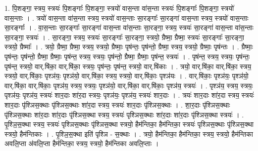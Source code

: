 \documentclass[17pt]{extarticle}
\begin{document}
1. पि॒शङ्गा॒ स्त्रय॒ स्त्रयः॑ पि॒शङ्गाः᳚ पि॒शङ्गा॒ स्त्रयो॑ वास॒न्ता वा॑स॒न्ता स्त्रयः॑ पि॒शङ्गाः᳚ पि॒शङ्गा॒ स्त्रयो॑ वास॒न्ताः । . त्रयो॑ वास॒न्ता वा॑स॒न्ता स्त्रय॒ स्त्रयो॑ वास॒न्ताः सा॒रङ्गाः᳚ सा॒रङ्गा॑ वास॒न्ता स्त्रय॒ स्त्रयो॑ वास॒न्ताः सा॒रङ्गाः᳚ । . वा॒स॒न्ताः सा॒रङ्गाः᳚ सा॒रङ्गा॑ वास॒न्ता वा॑स॒न्ताः सा॒रङ्गा॒ स्त्रय॒ स्त्रयः॑ सा॒रङ्गा॑ वास॒न्ता वा॑स॒न्ताः सा॒रङ्गा॒ स्त्रयः॑ । . सा॒रङ्गा॒ स्त्रय॒ स्त्रयः॑ सा॒रङ्गाः᳚ सा॒रङ्गा॒ स्त्रयो॒ ग्रैष्मा॒ ग्रैष्मा॒ स्त्रयः॑ सा॒रङ्गाः᳚ सा॒रङ्गा॒ स्त्रयो॒ ग्रैष्माः᳚ । . त्रयो॒ ग्रैष्मा॒ ग्रैष्मा॒ स्त्रय॒ स्त्रयो॒ ग्रैष्माः॒ पृष॑न्तः॒ पृष॑न्तो॒ ग्रैष्मा॒ स्त्रय॒ स्त्रयो॒ ग्रैष्माः॒ पृष॑न्तः । . ग्रैष्माः॒ पृष॑न्तः॒ पृष॑न्तो॒ ग्रैष्मा॒ ग्रैष्माः॒ पृष॑न्त॒ स्त्रय॒ स्त्रयः॒ पृष॑न्तो॒ ग्रैष्मा॒ ग्रैष्माः॒ पृष॑न्त॒ स्त्रयः॑ । . पृष॑न्त॒ स्त्रय॒ स्त्रयः॒ पृष॑न्तः॒ पृष॑न्त॒ स्त्रयो॒ वार्.षि॑का॒ वार्.षि॑का॒ स्त्रयः॒ पृष॑न्तः॒ पृष॑न्त॒ स्त्रयो॒ वार्.षि॑काः । . त्रयो॒ वार्.षि॑का॒ वार्.षि॑का॒ स्त्रय॒ स्त्रयो॒ वार्.षि॑काः॒ पृश्ञ॑यः॒ पृश्ञ॑यो॒ वार्.षि॑का॒ स्त्रय॒ स्त्रयो॒ वार्.षि॑काः॒ पृश्ञ॑यः । . वार्.षि॑काः॒ पृश्ञ॑यः॒ पृश्ञ॑यो॒ वार्.षि॑का॒ वार्.षि॑काः॒ पृश्ञ॑य॒ स्त्रय॒ स्त्रयः॒ पृश्ञ॑यो॒ वार्.षि॑का॒ वार्.षि॑काः॒ पृश्ञ॑य॒ स्त्रयः॑ । . पृश्ञ॑य॒ स्त्रय॒ स्त्रयः॒ पृश्ञ॑यः॒ पृश्ञ॑य॒ स्त्रयः॑ शार॒दाः शा॑र॒दा स्त्रयः॒ पृश्ञ॑यः॒ पृश्ञ॑य॒ स्त्रयः॑ शार॒दाः । . त्रयः॑ शार॒दाः शा॑र॒दा स्त्रय॒ स्त्रयः॑ शार॒दाः पृ॑श्ञिस॒क्थाः पृ॑श्ञिस॒क्थाः शा॑र॒दा स्त्रय॒ स्त्रयः॑ शार॒दाः पृ॑श्ञिस॒क्थाः । . शा॒र॒दाः पृ॑श्ञिस॒क्थाः पृ॑श्ञिस॒क्थाः शा॑र॒दाः शा॑र॒दाः पृ॑श्ञिस॒क्था स्त्रय॒ स्त्रयः॑ पृश्ञिस॒क्थाः शा॑र॒दाः शा॑र॒दाः पृ॑श्ञिस॒क्था स्त्रयः॑ । . पृ॒श्ञि॒स॒क्था स्त्रय॒ स्त्रयः॑ पृश्ञिस॒क्थाः पृ॑श्ञिस॒क्था स्त्रयो॒ हैम॑न्तिका॒ हैम॑न्तिका॒ स्त्रयः॑ पृश्ञिस॒क्थाः पृ॑श्ञिस॒क्था स्त्रयो॒ हैम॑न्तिकाः । . पृ॒श्ञि॒स॒क्था इति॑ पृश्ञि - स॒क्थाः । . त्रयो॒ हैम॑न्तिका॒ हैम॑न्तिका॒ स्त्रय॒ स्त्रयो॒ हैम॑न्तिका अवलि॒प्ता अ॑वलि॒प्ता हैम॑न्तिका॒ स्त्रय॒ स्त्रयो॒ हैम॑न्तिका अवलि॒प्ताः । \newline
\end{document}
